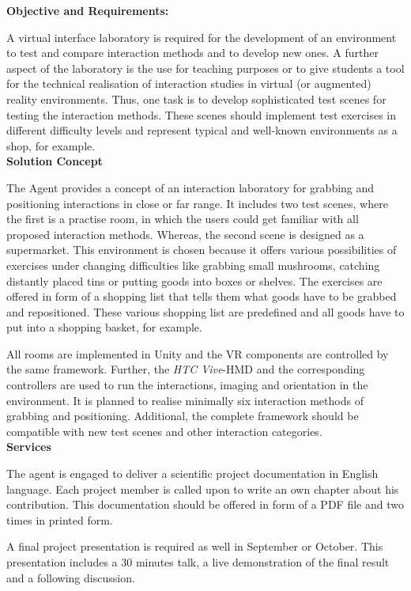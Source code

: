 \documentclass[a4paper, 12pt]{article}
\begin{document}
\textbf{Objective and Requirements:}

A virtual interface laboratory is required for the development of an environment to test and compare interaction methods and to develop new ones. A further aspect of the laboratory is the use for teaching purposes or to give students a tool for the technical realisation of interaction studies in virtual (or augmented) reality environments. Thus, one task is to develop sophisticated test scenes for testing the interaction methods. These scenes should implement test exercises in different difficulty levels and represent typical and well-known environments as a shop, for example. \\


\textbf{Solution Concept}
 
 The Agent provides a concept of an interaction laboratory for grabbing and positioning interactions in close or far range. It includes two test scenes, where the first is a practise room, in which the users could get familiar with all proposed interaction methods. Whereas, the second scene is designed as a supermarket. This environment is chosen because it offers various possibilities of exercises under changing difficulties like grabbing small mushrooms, catching distantly placed tins or putting goods into boxes or shelves. The exercises are offered in form of a shopping list that tells them what goods have to be grabbed and repositioned. These various shopping list are predefined and all goods have to put into a shopping basket, for example. 
 
 All rooms are implemented in Unity and the VR components are controlled by the same framework. Further, the \textit{HTC Vive}-HMD and the corresponding controllers are used to run the interactions, imaging and orientation in the environment. It is planned to realise minimally six interaction methods of grabbing and positioning. Additional, the complete framework should be compatible with new test scenes and other interaction categories. \\

 
\textbf{Services}

The agent is engaged to deliver a scientific project documentation in English language. Each project member is called upon to write an own chapter about his contribution. This documentation should be offered in form of a PDF file and two times in printed form. 

A final project presentation is required as well in September or October. This presentation includes a 30 minutes talk, a live demonstration of the final result and a following discussion.
\end{document}
